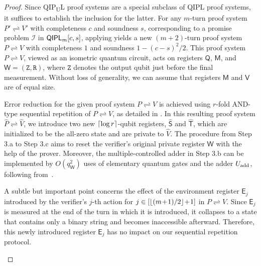 \documentclass[11pt, a4paper]{article}
\numberwithin{equation}{section}
\numberwithin{figure}{section}
\newcommand{\QIPL}{\textnormal{\textsf{QIPL}}\xspace}
\newcommand{\QIPUL}{\texorpdfstring{\textnormal{\textsf{QIP}\textsubscript{\textnormal{U}}\textsf{L}}}\xspace}
\newcommand{\protocol}[2]{{#1}\!\rightleftharpoons\!{#2}}
\DeclarePairedDelimiter\ceil{\lceil}{\rceil}
\DeclarePairedDelimiter\floor{\lfloor}{\rfloor}
\newcommand{\calI}{\mathcal{I}}
\newcommand{\sfE}{\mathsf{E}}
\newcommand{\sfM}{\mathsf{M}}
\newcommand{\sfQ}{\mathsf{Q}}
\newcommand{\sfS}{\mathsf{S}}
\newcommand{\sfT}{\mathsf{T}}
\newcommand{\sfV}{\mathsf{V}}
\newcommand{\sfW}{\mathsf{W}}
\newcommand{\ttR}{\mathtt{R}}
\newcommand{\ttZ}{\mathtt{Z}}
\newcommand{\hatP}{\widehat{P}}
\newcommand{\hatV}{\widehat{V}}
\begin{document}
\begin{proof}
    Since \QIPUL{} proof systems are a special subclass of \QIPL{} proof systems, it suffices to establish the inclusion for the latter. 
    For any $m$-turn proof system $\protocol{P'}{V'}$ with completeness $c$ and soundness $s$, corresponding to a promise problem $\calI$ in $\QIPL_m[c,s]$, applying  yields a new $(m+2)$-turn proof system $\protocol{P}{V}$ with completeness $1$ and soundness $1-(c-s)^2/2$.
    This proof system $\protocol{P}{V}$, viewed as an isometric quantum circuit, acts on registers $\sfQ$, $\sfM$, and $\sfW = (\ttZ, \ttR)$, where $\ttZ$ denotes the output qubit just before the final measurement. Without loss of generality, we can assume that registers $\sfM$ and $\sfV$ are of equal size. 
        
    Error reduction for the given proof system $\protocol{P}{V}$ is achieved using $r$-fold AND-type sequential repetition of $\protocol{P}{V}$, as detailed in . In this resulting proof system $\protocol{\hatP}{\hatV}$, we introduce two new $\ceil*{\log{r}}$-qubit registers, $\widehat{\sfS}$ and $\widehat{\sfT}$, which are initialized to be the all-zero state and are private to $\hatV$. 
    The procedure from Step 3.a to Step 3.c aims to reset the verifier's original private register $\sfW$ with the help of the prover. Moreover, the multiple-controlled adder in Step 3.b can be implemented by $O(q_{\sfW}^2)$ uses of elementary quantum gates and the adder $U_{\rm add}$, following from~\cite[Lemma 7.5 and Corollary 7.6]{BBC+95}.%

    A subtle but important point concerns the effect of the environment register $\sfE_j$ introduced by the verifier's $j$-th action for $j\in [\floor*{(m\!+\!1)/2}\!+\!1]$ in $\protocol{P}{V}$. Since $\sfE_j$ is measured at the end of the turn in which it is introduced, it collapses to a state that contains only a binary string and becomes inaccessible afterward. Therefore, this newly introduced register $\sfE_j$ has no impact on our sequential repetition protocol.
    
\begin{algorithm}[ht!]
    \SetAlgoVlined
    \setlength{\parskip}{5pt}


\end{algorithm}
\end{proof}
\end{document}

